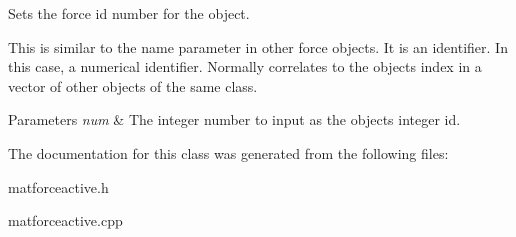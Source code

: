 Sets the force id number for the object. 

This is similar to the name parameter in other force objects. It is an identifier. In this case, a numerical identifier. Normally correlates to the objects index in a vector of other objects of the same class. 
\begin{DoxyParams}{Parameters}
{\em num} & The integer number to input as the objects integer id. \\
\hline
\end{DoxyParams}


The documentation for this class was generated from the following files\-:\begin{DoxyCompactItemize}
\item 
matforceactive.\-h\item 
matforceactive.\-cpp\end{DoxyCompactItemize}
